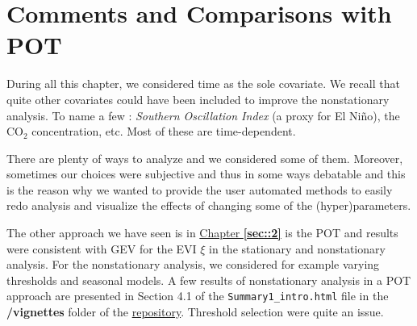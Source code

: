  
 
\section{Comments and Comparisons with POT}


During all this chapter, we considered time as the sole covariate. We recall that quite other covariates could have been included to improve the nonstationary analysis. To name a few : \emph{Southern Oscillation Index} (a proxy for El Niño), the $\text{CO}_2$ concentration, etc. Most of these are time-dependent.

There are plenty of ways to analyze and we considered some of them. Moreover, sometimes our choices were subjective and thus in some ways debatable and this is the reason why we wanted to provide the user automated methods to easily redo analysis and visualize the effects of changing some of the (hyper)parameters.

The other approach we have seen is in \hyperref[sec::2]{Chapter \textbf{\ref{sec::2}}} is the POT and results were consistent with GEV for the EVI $\xi$ in the stationary and nonstationary analysis. For the nonstationary analysis, we considered for example varying thresholds and seasonal models.
A few results of nonstationary analysis in a POT approach are presented in Section 4.1 of the \texttt{Summary1\_intro.html} file in the \textbf{/vignettes} folder of the \href{https://github.com/proto4426/PissoortThesis/}{repository}. Threshold selection were quite an issue.


